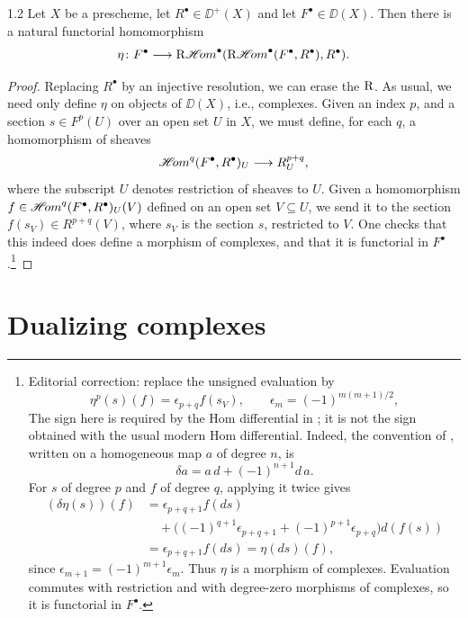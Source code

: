 \begin{booklemma}{1.2}\label{lem:5.1.2}
Let $X$ be a prescheme, let $R^\bullet\in\DD^+(X)$ and let $F^\bullet\in\DD(X)$. Then there is a natural functorial homomorphism
\[
\eta\colon F^\bullet\longrightarrow \mathop{\mathrm{R}\mathscr{H}\!om}\nolimits^\bullet(\mathop{\mathrm{R}\mathscr{H}\!om}\nolimits^\bullet(F^\bullet,R^\bullet),R^\bullet).
\]
\end{booklemma}

\begin{proof}
Replacing $R^\bullet$ by an injective resolution, we can erase the $\operatorname{R}$. As usual, we need only define $\eta$ on objects of $\DD(X)$, i.e., complexes. Given an index $p$, and a section $s\in F^{p}(U)$ over an open set $U$ in $X$, we must define, for each $q$, a homomorphism of sheaves
\[
\mathop{\mathscr{H}\!om}\nolimits^{q}(F^\bullet,R^\bullet)_U\longrightarrow R_U^{p+q},
\]
where the subscript $U$ denotes restriction of sheaves to $U$. Given a homomorphism $f\in\mathop{\mathscr{H}\!om}\nolimits^{q}(F^\bullet,R^\bullet)_U(V)$ defined on an open set $V\subseteq U$, we send it to the section $f(s_V)\in R^{p+q}(V)$, where $s_V$ is the section $s$, restricted to $V$. One checks that this indeed does define a morphism of complexes, and that it is functorial in $F^\bullet$.\footnote{Editorial correction: replace the unsigned evaluation by
\[
\eta^p(s)(f)=\epsilon_{p+q}f(s_V),
\qquad \epsilon_m=(-1)^{m(m+1)/2},
\]
The sign here is required by the Hom differential in ; it is not the sign obtained with the usual modern Hom differential.
Indeed, the convention of , written on a homogeneous map $a$ of degree $n$, is
\[
\delta a=a\,d+(-1)^{n+1}d\,a.
\]
For $s$ of degree $p$ and $f$ of degree $q$, applying it twice gives
\begin{align*}
(\delta\eta(s))(f)
 &=\epsilon_{p+q+1}f(ds) \\
 &\quad+\bigl((-1)^{q+1}\epsilon_{p+q+1}
              +(-1)^{p+1}\epsilon_{p+q}\bigr)d(f(s)) \\
 &=\epsilon_{p+q+1}f(ds)=\eta(ds)(f),
\end{align*}
since $\epsilon_{m+1}=(-1)^{m+1}\epsilon_m$. Thus $\eta$ is a morphism of complexes. Evaluation commutes with restriction and with degree-zero morphisms of complexes, so it is functorial in $F^\bullet$.}

\end{proof}

\section{Dualizing complexes}\label{sec:5.2}
\begingroup
\setlength{\emergencystretch}{2em}

